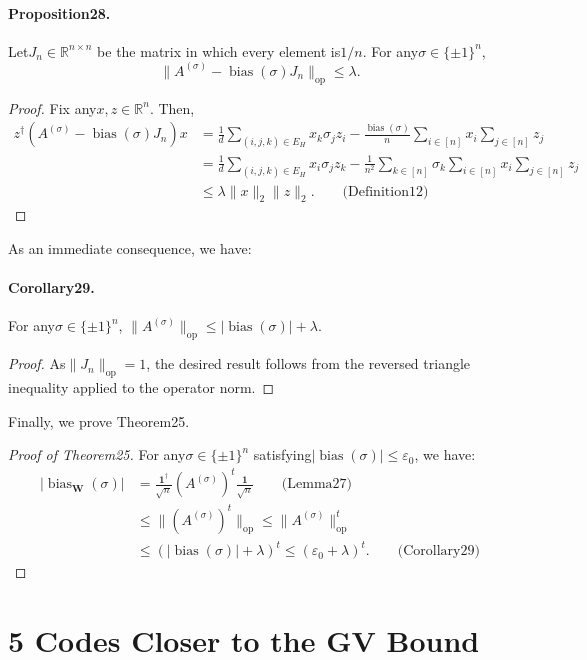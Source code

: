 \documentclass[10pt,a4paper]{article}
\DeclareMathOperator{\bias}{bias}
\begin{document}
\paragraph{Proposition28.} Let$J_n\in\mathbb R^{n\times n}$ be the matrix in which every element is$1/n$. For any$\sigma\in\{\pm1\}^n$,
\[\|A^{(\sigma)}-\bias(\sigma)J_n\|_{\mathrm{op}}\leq\lambda.\]
\begin{proof}
Fix any$x,z\in\mathbb R^n$. Then,
\begin{align*}
z^{\dagger}(A^{(\sigma)}-\bias(\sigma)J_n)x&=\frac1d\sum_{(i,j,k)\in E_H}x_k\sigma_jz_i-\frac{\bias(\sigma)}n\sum_{i\in[n]}x_i\sum_{j\in[n]}z_j\\
&=\frac1d\sum_{(i,j,k)\in E_H}x_i\sigma_jz_k-\frac1{n^2}\sum_{k\in[n]}\sigma_k\sum_{i\in[n]}x_i\sum_{j\in[n]}z_j\\
&\leq\lambda\|x\|_2\|z\|_2.\qquad\text{(Definition12)}
\end{align*}
\end{proof}
As an immediate consequence, we have:
\paragraph{Corollary29.} For any$\sigma\in\{\pm1\}^n$, $\|A^{(\sigma)}\|_{\mathrm{op}}\leq|\bias(\sigma)|+\lambda$.
\begin{proof}
As$\|J_n\|_{\mathrm{op}}=1$, the desired result follows from the reversed triangle inequality applied to the operator norm.
\end{proof}
Finally, we prove Theorem25.
\begin{proof}[Proof of Theorem25]
For any$\sigma\in\{\pm1\}^n$ satisfying$|\bias(\sigma)|\leq\varepsilon_0$, we have:
\begin{align*}
|\bias_{\mathbf W}(\sigma)|&=\frac{\mathbf1^{\dagger}}{\sqrt n}(A^{(\sigma)})^t\frac{\mathbf1}{\sqrt n}\qquad\text{(Lemma27)}\\
&\leq\|(A^{(\sigma)})^t\|_{\mathrm{op}}\leq\|A^{(\sigma)}\|_{\mathrm{op}}^t\\
&\leq(|\bias(\sigma)|+\lambda)^t\leq(\varepsilon_0+\lambda)^t.\qquad\text{(Corollary29)}
\end{align*}
\end{proof}

\section*{5 Codes Closer to the GV Bound}
\end{document}
